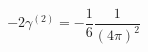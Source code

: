 \begin{equation}
- 2 \gamma^{(2)} = - \frac{1}{6} \frac{1}{(4\pi)^2} \label{gammaresult}
\end{equation}

